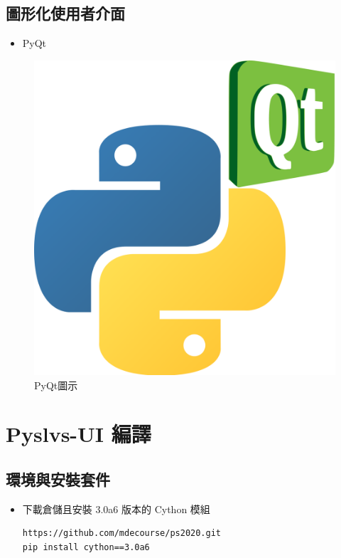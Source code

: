 \documentclass[14pt,a4paper]{report}  %
\newcommand{\fourteen}{\fontsize{14pt}{\baselineskip}\selectfont}%
\begin{document}
      \subsection{圖形化使用者介面}
      \begin{itemize}
      \item{PyQt}
      \end{itemize}
      \fourteen {Qt被廣泛應用於開發圖形化介面程式。主要特色為使用相同的程式碼皆可在支援的平台上執行與編譯，PyQt是Python語言的GUI編程解決方案之一，與Qt一樣是一個自由軟體，其API也與Qt類似，因此Qt的文件仍然可以應用於此，且與相同性質的軟體比較，PyQt的編程庫文件豐富許多。} 
      \begin{figure}[hbt!]
        \centering
        \includegraphics[scale=0.1]{PyQt.png} 
        \caption{PyQt圖示}
        \label{fig:scale}
        \end{figure}
      \section{Pyslvs-UI 編譯}



\subsection{環境與安裝套件}
		\begin{itemize}
		\item 下載倉儲且安裝 3.0a6 版本的 Cython 模組
		\begin{lstlisting}[caption=下載倉儲安裝Cython]
https://github.com/mdecourse/ps2020.git
pip install cython==3.0a6
		\end{lstlisting}
		\end{itemize}
\end{document}
